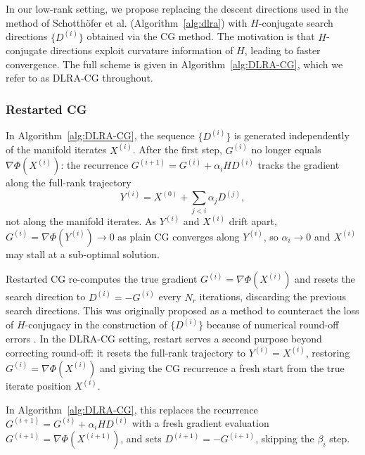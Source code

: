 In our low-rank setting, we propose replacing the descent directions used in the method of Schotthöfer et al. (Algorithm~\ref{alg:dlra}) with $H$-conjugate search directions $\{D^{(i)}\}$ obtained via the CG method. The motivation is that $H$-conjugate directions exploit curvature information of $H$, leading to faster convergence. The full scheme is given in Algorithm~\ref{alg:DLRA-CG}, which we refer to as DLRA-CG throughout.



\subsubsection{Restarted CG}\label{sec:restarted_cg}
In Algorithm~\ref{alg:DLRA-CG}, the sequence $\{D^{(i)}\}$ is generated 
independently of the manifold iterates $X^{(i)}$. After the first step, $G^{(i)}$ no longer equals $\nabla\Phi(X^{(i)})$: the recurrence $G^{(i+1)} = G^{(i)} + \alpha_i HD^{(i)}$ tracks the gradient along the full-rank trajectory
\begin{equation}\label{eq:full_rank_iterate}
    Y^{(i)} = X^{(0)} + \sum_{j<i} \alpha_j D^{(j)},
\end{equation}
not along the manifold iterates. As $Y^{(i)}$ and $X^{(i)}$ drift apart, 
$G^{(i)} = \nabla\Phi(Y^{(i)}) \to 0$ as plain CG converges along $Y^{(i)}$, so $\alpha_i \to 0$ and $X^{(i)}$ may stall at a sub-optimal solution.

Restarted CG \cite{powellRestartProceduresConjugate1977} re-computes the true gradient $G^{(i)} = \nabla\Phi(X^{(i)})$ and resets the search direction to $D^{(i)} = -G^{(i)}$ every $N_r$ iterations, discarding the previous search directions. This was originally proposed as a method to counteract the loss of $H$-conjugacy in the construction of $\{D^{(i)}\}$ because of numerical round-off errors \cite{hestenesMethodsConjugateGradients1952, powellRestartProceduresConjugate1977}. In the DLRA-CG setting, restart serves a second purpose beyond correcting round-off: it resets the full-rank trajectory to $Y^{(i)} = X^{(i)}$, restoring $G^{(i)} = \nabla\Phi(X^{(i)})$ and giving the CG recurrence a fresh start from the true iterate position $X^{(i)}$.

In Algorithm~\ref{alg:DLRA-CG}, this replaces the recurrence $G^{(i+1)} = G^{(i)} + \alpha_i HD^{(i)}$ with a fresh gradient evaluation $G^{(i+1)} = \nabla\Phi(X^{(i+1)})$, and sets $D^{(i+1)} = -G^{(i+1)}$, skipping the $\beta_i$ step.


